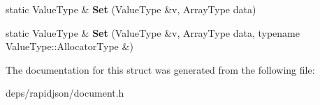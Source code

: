 \begin{DoxyCompactItemize}
\item 
static Value\+Type \& {\bfseries Set} (Value\+Type \&v, Array\+Type data)\hypertarget{structinternal_1_1_type_helper_3_01_value_type_00_01typename_01_value_type_1_1_array_01_4_a7bab3fa93fb8bda16baf289e1d281315}{}\label{structinternal_1_1_type_helper_3_01_value_type_00_01typename_01_value_type_1_1_array_01_4_a7bab3fa93fb8bda16baf289e1d281315}

\item 
static Value\+Type \& {\bfseries Set} (Value\+Type \&v, Array\+Type data, typename Value\+Type\+::\+Allocator\+Type \&)\hypertarget{structinternal_1_1_type_helper_3_01_value_type_00_01typename_01_value_type_1_1_array_01_4_adba46e8947dcfecaeca5a5a5d8bb36cc}{}\label{structinternal_1_1_type_helper_3_01_value_type_00_01typename_01_value_type_1_1_array_01_4_adba46e8947dcfecaeca5a5a5d8bb36cc}

\end{DoxyCompactItemize}


The documentation for this struct was generated from the following file\+:\begin{DoxyCompactItemize}
\item 
deps/rapidjson/document.\+h\end{DoxyCompactItemize}
